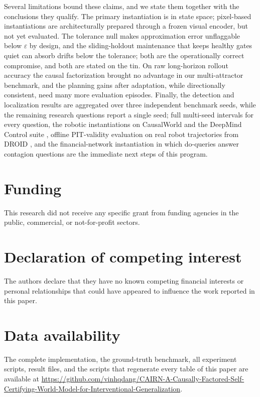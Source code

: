 \documentclass[preprint,12pt]{elsarticle}
\newif\ifanon
\theoremstyle{definition}
\theoremstyle{remark}
\begin{document}
Several limitations bound these claims, and we state them together with
the conclusions they qualify. The primary instantiation is in state
space; pixel-based instantiations are architecturally prepared through a
frozen visual encoder, but not yet evaluated. The tolerance null makes
approximation error unflaggable below $\varepsilon$ by design, and the
sliding-holdout maintenance that keeps healthy gates quiet can absorb
drifts below the tolerance; both are the operationally correct
compromise, and both are stated on the tin. On raw long-horizon rollout
accuracy the causal factorization brought no advantage in our
multi-attractor benchmark, and the planning gains after adaptation,
while directionally consistent, need many more evaluation episodes.
Finally, the detection and localization results are aggregated over
three independent benchmark seeds, while the remaining research
questions report a single seed; full multi-seed intervals for every
question, the robotic instantiations on
CausalWorld and the DeepMind Control suite
\citep{ahmed2021causalworld,tassa2018deepmind}, offline PIT-validity
evaluation on real robot trajectories from DROID
\citep{khazatsky2024droid}, and the financial-network instantiation in
which do-queries answer contagion questions
\citep{eisenberg2001systemic,battiston2012debtrank} are the immediate
next steps of this program.

\section*{Funding}
This research did not receive any specific grant from funding agencies
in the public, commercial, or not-for-profit sectors.

\section*{Declaration of competing interest}
The authors declare that they have no known competing financial
interests or personal relationships that could have appeared to
influence the work reported in this paper.

\ifanon\else
\section*{Data availability}
The complete implementation, the ground-truth benchmark, all experiment
scripts, result files, and the scripts that regenerate every table of
this paper are available at
\url{https://github.com/vinhqdang/CAIRN-A-Causally-Factored-Self-Certifying-World-Model-for-Interventional-Generalization}.
\fi
\ifanon
\section*{Data availability}
The complete implementation, the ground-truth benchmark, all experiment
scripts, result files, and the scripts that regenerate every table of
this paper will be released in a public repository upon acceptance; an
anonymized archive is provided to reviewers.
\fi



\end{document}
